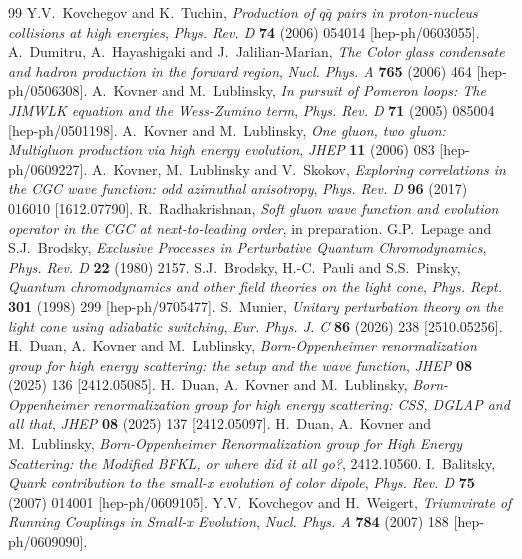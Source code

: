 \begin{thebibliography}{99}
 Y.V.~Kovchegov and K.~Tuchin, \emph{Production of $q\bar q$ pairs in proton-nucleus collisions at high energies}, \emph{Phys. Rev. D} \textbf{74} (2006) 054014 [hep-ph/0603055].
 A.~Dumitru, A.~Hayashigaki and J.~Jalilian-Marian, \emph{The Color glass condensate and hadron production in the forward region}, \emph{Nucl. Phys. A} \textbf{765} (2006) 464 [hep-ph/0506308].
 A.~Kovner and M.~Lublinsky, \emph{In pursuit of Pomeron loops: The JIMWLK equation and the Wess-Zumino term}, \emph{Phys. Rev. D} \textbf{71} (2005) 085004 [hep-ph/0501198].
 A.~Kovner and M.~Lublinsky, \emph{One gluon, two gluon: Multigluon production via high energy evolution}, \emph{JHEP} \textbf{11} (2006) 083 [hep-ph/0609227].
 A.~Kovner, M.~Lublinsky and V.~Skokov, \emph{Exploring correlations in the CGC wave function: odd azimuthal anisotropy}, \emph{Phys. Rev. D} \textbf{96} (2017) 016010 [1612.07790].
 R.~Radhakrishnan, \emph{Soft gluon wave function and evolution operator in the CGC at next-to-leading order}, in preparation.
 G.P.~Lepage and S.J.~Brodsky, \emph{Exclusive Processes in Perturbative Quantum Chromodynamics}, \emph{Phys. Rev. D} \textbf{22} (1980) 2157.
 S.J.~Brodsky, H.-C.~Pauli and S.S.~Pinsky, \emph{Quantum chromodynamics and other field theories on the light cone}, \emph{Phys. Rept.} \textbf{301} (1998) 299 [hep-ph/9705477].
 S.~Munier, \emph{Unitary perturbation theory on the light cone using adiabatic switching}, \emph{Eur. Phys. J. C} \textbf{86} (2026) 238 [2510.05256].
 H.~Duan, A.~Kovner and M.~Lublinsky, \emph{Born-Oppenheimer renormalization group for high energy scattering: the setup and the wave function}, \emph{JHEP} \textbf{08} (2025) 136 [2412.05085].
 H.~Duan, A.~Kovner and M.~Lublinsky, \emph{Born-Oppenheimer renormalization group for high energy scattering: CSS, DGLAP and all that}, \emph{JHEP} \textbf{08} (2025) 137 [2412.05097].
 H.~Duan, A.~Kovner and M.~Lublinsky, \emph{Born-Oppenheimer Renormalization group for High Energy Scattering: the Modified BFKL, or where did it all go?}, 2412.10560.
 I.~Balitsky, \emph{Quark contribution to the small-x evolution of color dipole}, \emph{Phys. Rev. D} \textbf{75} (2007) 014001 [hep-ph/0609105].
 Y.V.~Kovchegov and H.~Weigert, \emph{Triumvirate of Running Couplings in Small-x Evolution}, \emph{Nucl. Phys. A} \textbf{784} (2007) 188 [hep-ph/0609090].

\end{thebibliography}

